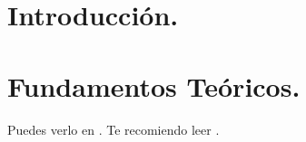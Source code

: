 \documentclass[fleqn, 11pt, a4paper]{book}
\newcommand\blankpage{%
  \null
  \thispagestyle{empty}%
  \newpage}
\begin{document}
\setlength{\parskip}{0.5cm}

\renewcommand{\listtablename}{Índice de tablas}
\renewcommand{\tablename}{Tabla}

\renewcommand{\lstlistlistingname}{Índice de fragmentos de código}
\renewcommand{\lstlistingname}{Código}
\renewcommand{\mtctitle}{}

\dominitoc



\blankpage



\blankpage


%


\setcounter{page}{1}%

\renewcommand{\contentsname}{Índice de contenidos}

\pagestyle{empty}

\tableofcontents


\newpage



\chapter{Introducción.}
\minitoc

\newpage

\pagestyle{fancy}



\chapter{Fundamentos Teóricos.}

\minitoc

\newpage




\appendix



Puedes verlo en \cite{Patricio2011}. Te recomiendo leer \cite{Patricio2011, Zacarias2009, Alfonso2010b, Alfonso2010a}.

\renewcommand\bibname{Referencias}


\end{document}
